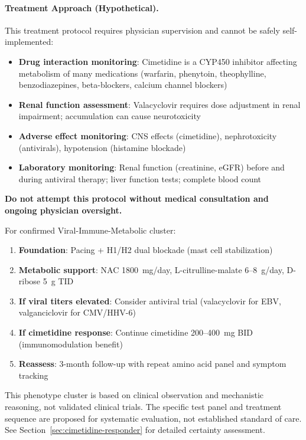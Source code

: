 \paragraph{Treatment Approach (Hypothetical).}

\begin{warning}
This treatment protocol requires physician supervision and cannot be safely self-implemented:
\begin{itemize}
    \item \textbf{Drug interaction monitoring}: Cimetidine is a CYP450 inhibitor affecting metabolism of many medications (warfarin, phenytoin, theophylline, benzodiazepines, beta-blockers, calcium channel blockers)
    \item \textbf{Renal function assessment}: Valacyclovir requires dose adjustment in renal impairment; accumulation can cause neurotoxicity
    \item \textbf{Adverse effect monitoring}: CNS effects (cimetidine), nephrotoxicity (antivirals), hypotension (histamine blockade)
    \item \textbf{Laboratory monitoring}: Renal function (creatinine, eGFR) before and during antiviral therapy; liver function tests; complete blood count
\end{itemize}

\textbf{Do not attempt this protocol without medical consultation and ongoing physician oversight.}
\end{warning}

For confirmed Viral-Immune-Metabolic cluster:
\begin{enumerate}
    \item \textbf{Foundation}: Pacing + H1/H2 dual blockade (mast cell stabilization)
    \item \textbf{Metabolic support}: NAC 1800~mg/day, L-citrulline-malate 6--8~g/day, D-ribose 5~g TID
    \item \textbf{If viral titers elevated}: Consider antiviral trial (valacyclovir for EBV, valganciclovir for CMV/HHV-6)
    \item \textbf{If cimetidine response}: Continue cimetidine 200--400~mg BID (immunomodulation benefit)
    \item \textbf{Reassess}: 3-month follow-up with repeat amino acid panel and symptom tracking
\end{enumerate}

\begin{warning}
This phenotype cluster is based on clinical observation and mechanistic reasoning, not validated clinical trials. The specific test panel and treatment sequence are proposed for systematic evaluation, not established standard of care. See Section~\ref{sec:cimetidine-responder} for detailed certainty assessment.
\end{warning}

